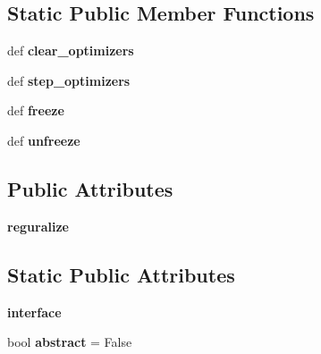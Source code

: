 \subsection*{Static Public Member Functions}
\begin{DoxyCompactItemize}
\item 
def {\bfseries clear\+\_\+optimizers}\hypertarget{classexperiments_1_1UnsupervisedTranslation_a67b932d4da5744f2721f7f27b04596f9}{}\label{classexperiments_1_1UnsupervisedTranslation_a67b932d4da5744f2721f7f27b04596f9}

\item 
def {\bfseries step\+\_\+optimizers}\hypertarget{classexperiments_1_1UnsupervisedTranslation_a9f0126eb73903d5154d6050e8bfb94fe}{}\label{classexperiments_1_1UnsupervisedTranslation_a9f0126eb73903d5154d6050e8bfb94fe}

\item 
def {\bfseries freeze}\hypertarget{classexperiments_1_1UnsupervisedTranslation_ad04f4db2b0dca3c3f64362ceb5466778}{}\label{classexperiments_1_1UnsupervisedTranslation_ad04f4db2b0dca3c3f64362ceb5466778}

\item 
def {\bfseries unfreeze}\hypertarget{classexperiments_1_1UnsupervisedTranslation_a4ad4d9b7d70e919b6276e713e50b10b6}{}\label{classexperiments_1_1UnsupervisedTranslation_a4ad4d9b7d70e919b6276e713e50b10b6}

\end{DoxyCompactItemize}
\subsection*{Public Attributes}
\begin{DoxyCompactItemize}
\item 
{\bfseries reguralize}\hypertarget{classexperiments_1_1UnsupervisedTranslation_a793362a50b18222e31315f2d3d0d7dbd}{}\label{classexperiments_1_1UnsupervisedTranslation_a793362a50b18222e31315f2d3d0d7dbd}

\end{DoxyCompactItemize}
\subsection*{Static Public Attributes}
\begin{DoxyCompactItemize}
\item 
{\bfseries interface}
\item 
bool {\bfseries abstract} = False\hypertarget{classexperiments_1_1UnsupervisedTranslation_a37ce0fbf10e633220376f45931830c29}{}\label{classexperiments_1_1UnsupervisedTranslation_a37ce0fbf10e633220376f45931830c29}

\end{DoxyCompactItemize}


